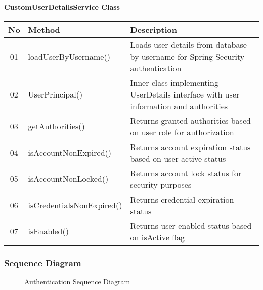 \documentclass[12pt,a4paper]{article}
\begin{document}
\paragraph{CustomUserDetailsService Class}
\begin{longtable}{|c|l|p{8cm}|}
\hline
\textbf{No} & \textbf{Method} & \textbf{Description} \\
\hline
01 & loadUserByUsername() & Loads user details from database by username for Spring Security authentication \\
\hline
02 & UserPrincipal() & Inner class implementing UserDetails interface with user information and authorities \\
\hline
03 & getAuthorities() & Returns granted authorities based on user role for authorization \\
\hline
04 & isAccountNonExpired() & Returns account expiration status based on user active status \\
\hline
05 & isAccountNonLocked() & Returns account lock status for security purposes \\
\hline
06 & isCredentialsNonExpired() & Returns credential expiration status \\
\hline
07 & isEnabled() & Returns user enabled status based on isActive flag \\
\hline
\end{longtable}

\subsubsection{Sequence Diagram}

\begin{figure}[H]
\centering
{}
\caption{Authentication Sequence Diagram}
\label{fig:auth-sequence}
\end{figure}
\end{document}
